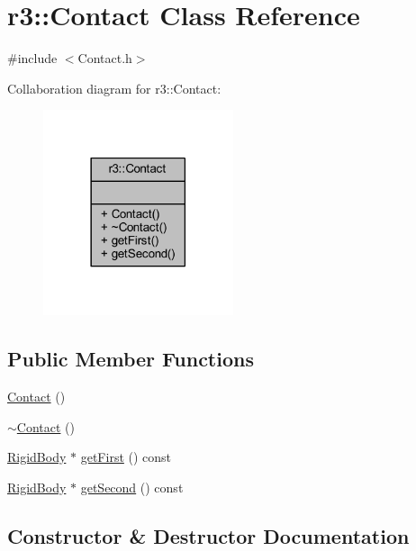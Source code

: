 \hypertarget{classr3_1_1_contact}{}\section{r3\+:\+:Contact Class Reference}
\label{classr3_1_1_contact}


{\ttfamily \#include $<$Contact.\+h$>$}



Collaboration diagram for r3\+:\+:Contact\+:\nopagebreak
\begin{figure}[H]
\begin{center}
\leavevmode
\includegraphics[width=158pt]{classr3_1_1_contact__coll__graph}
\end{center}
\end{figure}
\subsection*{Public Member Functions}
\begin{DoxyCompactItemize}
\item 
\mbox{\hyperlink{classr3_1_1_contact_af2648c9a1e37583ac230a40f4fc6b72d}{Contact}} ()
\item 
\mbox{\hyperlink{classr3_1_1_contact_a011905bfa1cfa3ed459650796b105c6a}{$\sim$\+Contact}} ()
\item 
\mbox{\hyperlink{classr3_1_1_rigid_body}{Rigid\+Body}} $\ast$ \mbox{\hyperlink{classr3_1_1_contact_adf157981ebfd1552521afe7b25e9239c}{get\+First}} () const
\item 
\mbox{\hyperlink{classr3_1_1_rigid_body}{Rigid\+Body}} $\ast$ \mbox{\hyperlink{classr3_1_1_contact_a90af8f5c7cba65a6a84c57b5a6ef6d70}{get\+Second}} () const
\end{DoxyCompactItemize}


\subsection{Constructor \& Destructor Documentation}
\mbox{\label{classr3_1_1_contact_af2648c9a1e37583ac230a40f4fc6b72d}} 

